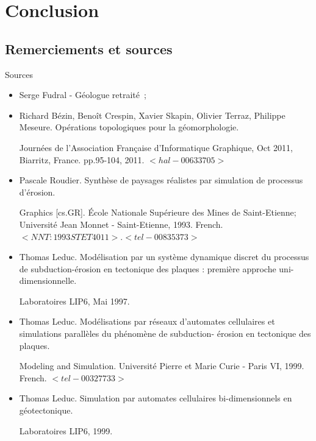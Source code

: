 \documentclass{beamer}
\begin{document}
\section{Conclusion}

\subsection{Remerciements et sources}
\begin{frame}{Sources}
  \begin{scriptsize}
  \begin{itemize}
   \item Serge Fudral - Géologue retraité~;
   \item Richard Bézin, Benoît Crespin, Xavier Skapin, Olivier Terraz, Philippe Meseure. Opérations
topologiques pour la géomorphologie.
    \begin{tiny} 
     Journées de l’Association Française d’Informatique Graphique, Oct 2011, Biarritz, France. pp.95-104, 2011. $<hal-00633705>$
    \end{tiny}
   \item Pascale Roudier. Synthèse de paysages réalistes par simulation de processus d’érosion. 
    \begin{tiny}
    Graphics
[cs.GR]. École Nationale Supérieure des Mines de Saint-Etienne; Université Jean Monnet -
Saint-Etienne, 1993. French. $<NNT : 1993STET4011>. <tel-00835373>$
	\end{tiny}
   \item Thomas Leduc. Modélisation par un système dynamique discret du processus de subduction-érosion en tectonique des plaques : première approche uni-dimensionnelle. 
    \begin{tiny}
    Laboratoires LIP6, Mai 1997.
    \end{tiny}
   \item Thomas Leduc. Modélisations par réseaux d’automates cellulaires et simulations parallèles
du phénomène de subduction- érosion en tectonique des plaques. 
     \begin{tiny}
     Modeling and Simulation.
Université Pierre et Marie Curie - Paris VI, 1999. French. $<tel-00327733>$
	 \end{tiny}
   \item Thomas Leduc. Simulation par automates cellulaires bi-dimensionnels en géotectonique. 
     \begin{tiny}
     Laboratoires LIP6, 1999.
     \end{tiny}

\end{itemize}
\end{scriptsize}
\end{frame}
\end{document}
